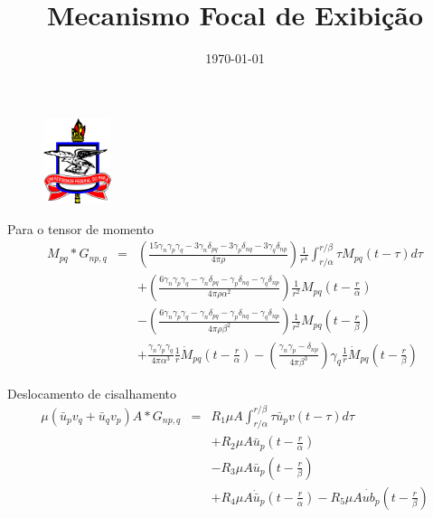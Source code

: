 \documentclass{beamer}
\title[Seminário]{Mecanismo Focal de Exibição} %
\author{} %
\institute[UFPA] %
{
	Professor: Jessé Costa\\
Universidade Federal do Pará \\ %
\medskip
}
\date{\today} %
\newcommand{\ub}{\bar{u}}
\begin{document}
 \begin{frame}
\begin{figure}[htb]
\centering
\includegraphics[width= 2cm, height= 2.5cm]{logo.jpg}
\end{figure}

\titlepage
\end{frame}
\begin{frame}{Para o tensor de momento}
\small
\begin{eqnarray}
M_{pq} \ast G_{np,q} &=&\left(\frac{15\gamma_n\gamma_p\gamma_q-3\gamma_n\delta_{pq}-3\gamma_p\delta_{nq}-3\gamma_{q}\delta_{np}}{4\pi\rho}\right)\frac{1}{r^4}\int_{r/\alpha}^{r/\beta} \tau M_{pq}(t-\tau) d\tau \nonumber \\
&&+ \left(\frac{6\gamma_n\gamma_p\gamma_q-\gamma_n\delta_{pq}-\gamma_p\delta_{nq}-\gamma_{q}\delta_{np}}{4\pi\rho\alpha^2}\right)\frac{1}{r^2}M_{pq}\left(t-\frac{r}{\alpha}\right) \nonumber \\
&&-
\left(\frac{6\gamma_n\gamma_p\gamma_q-\gamma_n\delta_{pq}-\gamma_p\delta_{nq}-\gamma_{q}\delta_{np}}{4\pi\rho\beta^2}\right)\frac{1}{r^2}M_{pq}\left(t-\frac{r}{\beta}\right) \nonumber \\
&&+ \frac{\gamma_n \gamma_p \gamma_q}{4\pi\alpha^3}\frac{1}{r}\dot{M}_{pq}\left(t-\frac{r}{\alpha}\right)- \left(\frac{\gamma_n\gamma_p-\delta_{np}}{4\pi\beta^3}\right)\gamma_{q}\frac{1}{r}\dot{M}_{pq}\left(t-\frac{r}{\beta}\right) \nonumber
\end{eqnarray}

\end{frame}

\begin{frame}{Deslocamento de cisalhamento}
	\begin{eqnarray}
	\mu(\ub_pv_q+\ub_qv_p)A \ast G_{np,q}&=&R_1\mu A\int_{r/\alpha}^{r/\beta} \tau \ub_pv(t-\tau) d\tau \nonumber \\
	&&+ R_2\mu A\ub_p\left(t-\frac{r}{\alpha}\right) \nonumber \\
	&&-
    R_3\mu A\ub_p\left(t-\frac{r}{\beta}\right) \nonumber \\
	&&+ R_4\mu A\dot{\ub}_{p}\left(t-\frac{r}{\alpha}\right)- R_5\mu A\dot{ub}_{p}\left(t-\frac{r}{\beta}\right) \nonumber
	\end{eqnarray}

\end{frame}
\end{document}
